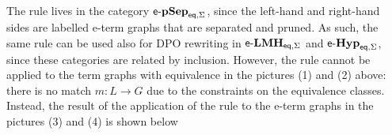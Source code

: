 \documentclass[3p]{elsarticle}
\newcommand{\eq}{\mathsf{eq}}
\newcommand{\catname}[1]{\textbf{\textup{#1}}}
\newcommand{\egg}{\mathsf{e}\text{-}\catname{Hyp}_\eq}
\newcommand{\eggll}{\mathsf{e}\text{-}\catname{Hyp}_{\eq, \Sigma}}
\newcommand{\elm}{\mathsf{e}\text{-}\catname{LMH}_\eq}
\newcommand{\eps}{\mathsf{e}\text{-}\catname{pSep}_\eq}
\newcommand{\lelmBis}{\mathsf{e}\text{-}\catname{LMH}_{\eq, \Sigma}}
\newcommand{\lepsBis}{\mathsf{e}\text{-}\catname{pSep}_{\eq, \Sigma}}
\theoremstyle{remark}
\theoremstyle{definition}
\begin{document}
The rule lives in the category $\lepsBis$, since the left-hand and right-hand sides are labelled e-term graphs 
that are separated and pruned. As such, the same rule can be used also for DPO rewriting in $\lelmBis$ and $\eggll$,
since these categories are related by inclusion.
%
%
%
%
However, the rule cannot be applied to the term graphs with equivalence
 in the pictures (1) and (2) above: there is no match $m: L\to G$ due to the 
 constraints on the equivalence classes.
 Instead, the result of the application of the rule 
to the e-term graphs in the pictures (3) and (4) is shown below
\end{document}
